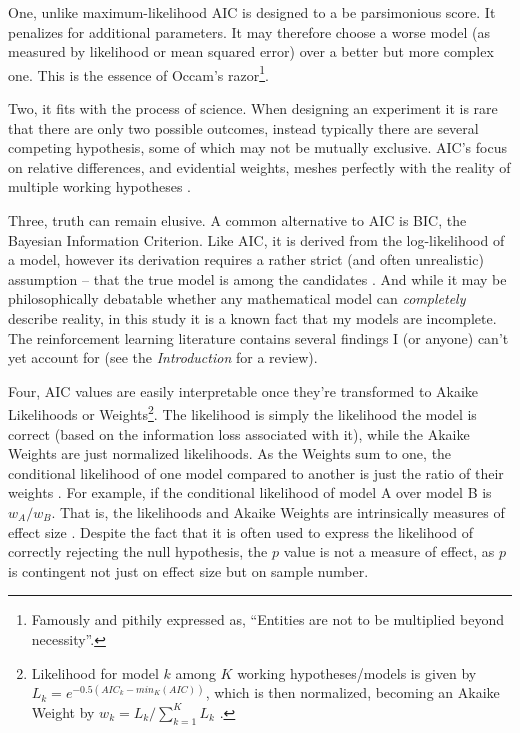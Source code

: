 \documentclass[doc,12pt]{apa}        %
\begin{document}
One, unlike maximum-likelihood AIC is designed to a be parsimonious score.  It penalizes for additional parameters.  It may therefore choose a worse model (as measured by likelihood or mean squared error) over a better but more complex one. This is the essence of Occam's razor\footnote{Famously and pithily expressed as, ``Entities are not to be multiplied beyond necessity''.}. 

Two, it fits with the process of science.  When designing an experiment it is rare that there are only two possible outcomes, instead typically there are several competing hypothesis, some of which may not be mutually exclusive.  AIC's focus on relative differences, and evidential weights, meshes perfectly with the reality of multiple working hypotheses \cite{Burnham:2004p9621}.

Three, truth can remain elusive.  A common alternative to AIC is BIC, the Bayesian Information Criterion.  Like AIC, it is derived from the log-likelihood of a model, however its derivation requires a rather strict (and often unrealistic) assumption -- that the true model is among the candidates \cite{Forster:2000p9623}.  And while it may be philosophically debatable whether any mathematical model can \emph{completely} describe reality, in this study it is a known fact that my models are incomplete.  The reinforcement learning literature contains several findings I (or anyone) can't yet account for (see the \emph{Introduction} for a review).  

Four, AIC values are easily interpretable once they're transformed to Akaike Likelihoods or Weights\footnote{
    Likelihood for model $k$ among $K$ working hypotheses/models is given by $L_k = e^{-0.5({AIC}_k - {min}_{K}{(AIC)})}$, which is then normalized, becoming an Akaike Weight by $w_k = L_k / \sum\limits_{k=1}^K L_k$ \cite{Burnham:2004p9621}.}.  The likelihood is simply the likelihood the model is correct (based on the information loss associated with it), while the Akaike Weights are just normalized likelihoods.  As the Weights sum to one, the conditional likelihood of one model compared to another is just the ratio of their weights \cite{Burnham:2004p9621}.  For example, if the conditional likelihood of model A over model B is $w_A/w_B$.  That is, the likelihoods and Akaike Weights are intrinsically measures of effect size \cite{Anderson:2000p9475,Forster:2000p9623}.  Despite the fact that it is often used to express the likelihood of correctly rejecting the null hypothesis, the $p$ value is not a measure of effect, as $p$ is contingent not just on effect size but on sample number.  
    
\end{document}
